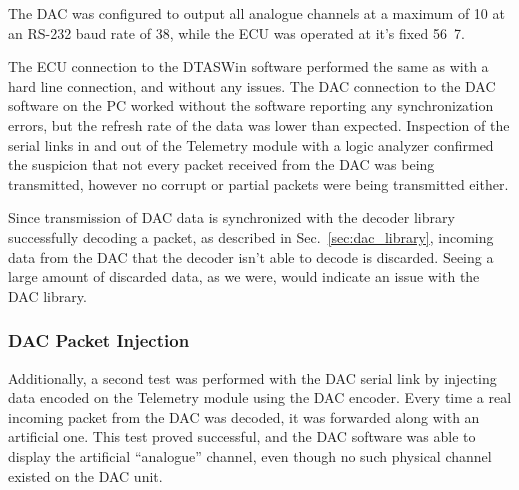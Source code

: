 The DAC was configured to output all analogue channels at a maximum of \unit{10}{\hertz} at an RS-232 baud rate of \unit{38}{\kilo\bit\per\second}, while the ECU was operated at it's fixed \unit{56.7}{\kilo\bit\per\second}.

The ECU connection to the DTASWin software performed the same as with a hard line connection, and without any issues. The DAC connection to the DAC software on the PC worked without the software reporting any synchronization errors, but the refresh rate of the data was lower than expected. Inspection of the serial links in and out of the Telemetry module with a logic analyzer confirmed the suspicion that not every packet received from the DAC was being transmitted, however no corrupt or partial packets were being transmitted either.

Since transmission of DAC data is synchronized with the decoder library successfully decoding a packet, as described in Sec.\ \ref{sec:dac_library}, incoming data from the DAC that the decoder isn't able to decode is discarded. Seeing a large amount of discarded data, as we were, would indicate an issue with the DAC library.

\subsubsection{DAC Packet Injection}

Additionally, a second test was performed with the DAC serial link by injecting data encoded on the Telemetry module using the DAC encoder. Every time a real incoming packet from the DAC was decoded, it was forwarded along with an artificial one. This test proved successful, and the DAC software was able to display the artificial ``analogue'' channel, even though no such physical channel existed on the DAC unit.